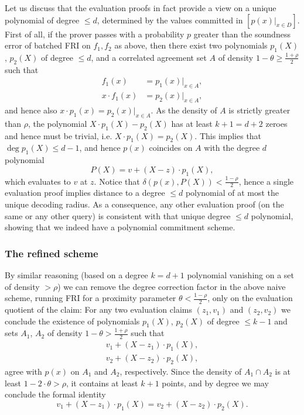 \documentclass[11pt]{article}
\theoremstyle{definition}
\theoremstyle{remark}
\begin{document}
Let us discuss that the evaluation proofs in fact provide a view on a unique polynomial of degree $\leq d$, determined by the values committed in $[p(x)|_{x\in D}]$.
First of all, if the prover passes with a probability $p$ greater than the soundness error of batched FRI on $f_1, f_2$ as above,  then there exist two polynomials $p_1(X)$, $p_2(X)$ of degree $\leq d$, and a correlated agreement set $A$ of density $1-\theta \geq \frac{1+\rho}{2}$ such that
\begin{align*}
f_1(x) &=p_1(x) \big|_{x\in A},
\\
x\cdot f_1(x) &= p_2(x)\big|_{x\in A},
\end{align*}
and hence also $x\cdot p_1(x) =p_2(x)\big|_{x\in A}$. 
As the density of $A$ is strictly greater than $\rho$, the polynomial $X\cdot p_1(X)-p_2(X)$ has at least $k+1=d+2$ zeroes and hence must be trivial, i.e. $X\cdot p_1(X) = p_2(X)$. 
This implies that $\deg p_1(X)\leq d-1$, and hence $p(x)$ coincides on $A$ with the degree $d$ polynomial 
\[
P(X)= v + (X-z)\cdot p_1(X),
\]
which evaluates to $v$ at $z$. 
Notice that $\delta(p(x),P(X)) < \frac{1-\rho}{2}$, hence a single evaluation proof implies distance to a degree $\leq d$ polynomial of at most the unique decoding radius. 
As a consequence, any other evaluation proof (on the same or any other query) is consistent with that unique degree $\leq d$ polynomial, showing that we indeed have a polynomial commitment scheme.

\subsubsection{The refined scheme}

By similar reasoning (based on a degree $k=d+1$ polynomial vanishing on a set of density $>\rho$)  we can  remove the degree correction factor in the above naive scheme, running FRI for a proximity parameter $\theta < \frac{1-\rho}{2}$, only on the evaluation quotient of the claim: 
For any two evaluation claims $(z_1,v_1)$ and $(z_2, v_2)$ we conclude the existence of polynomials $p_1(X)$, $p_2(X)$ of degree $\leq k-1$ and sets $A_1$, $A_2$ of density $1-\theta > \frac{1+\rho}{2}$ such that
\[
\begin{aligned}
v_1 + (X-z_1)\cdot p_1(X),
\\
v_2 + (X-z_2)\cdot p_2(X),
\end{aligned}
\]
agree with $p(x)$  on $A_1$ and $A_2$, respectively.
Since the density of $A_1\cap A_2$ is at least $1 - 2\cdot \theta > \rho$, it contains at least $k + 1$ points, and by degree we may conclude the formal identity
\[
v_1 + (X-z_1)\cdot p_1(X) = v_2 + (X-z_2)\cdot p_2(X).
\]
\end{document}
